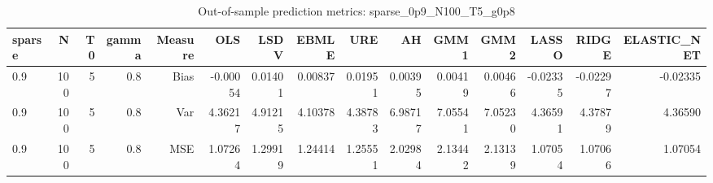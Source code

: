 \begin{table}[!htbp]\centering
\caption{Out-of-sample prediction metrics: sparse_0p9_N100_T5_g0p8}
\label{tab:table3_sparse_0p9_N100_T5_g0p8}
\begin{tabular}{lrrrrrrrrrrrrrr}
\hline
sparse & N & T0 & gamma & Measure & OLS & LSDV & EBMLE & URE & AH & GMM1 & GMM2 & LASSO & RIDGE & ELASTIC_NET \\
\hline
0.9 & 100 & 5 & 0.8 & Bias & -0.00054 & 0.01401 & 0.00837 & 0.01951 & 0.00395 & 0.00419 & 0.00466 & -0.02335 & -0.02297 & -0.02335 \\
0.9 & 100 & 5 & 0.8 & Var & 4.36217 & 4.91215 & 4.10378 & 4.38783 & 6.98717 & 7.05541 & 7.05230 & 4.36591 & 4.37879 & 4.36590 \\
0.9 & 100 & 5 & 0.8 & MSE & 1.07264 & 1.29919 & 1.24414 & 1.25551 & 2.02984 & 2.13442 & 2.13139 & 1.07054 & 1.07066 & 1.07054 \\
\hline
\end{tabular}
\end{table}

